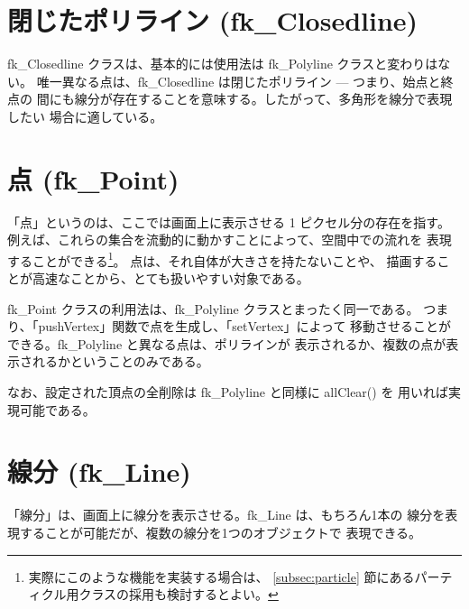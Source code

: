 \section{閉じたポリライン (fk\_Closedline)}
fk\_Closedline クラスは、基本的には使用法は fk\_Polyline クラスと変わりはない。
唯一異なる点は、fk\_Closedline は閉じたポリライン --- つまり、始点と終点の
間にも線分が存在することを意味する。したがって、多角形を線分で表現したい
場合に適している。
\section{点 (fk\_Point)}
「点」というのは、ここでは画面上に表示させる 1 ピクセル分の存在を指す。
例えば、これらの集合を流動的に動かすことによって、空間中での流れを
表現することができる\footnote{実際にこのような機能を実装する場合は、
\ref{subsec:particle} 節にあるパーティクル用クラスの採用も検討するとよい。}。
点は、それ自体が大きさを持たないことや、
描画することが高速なことから、とても扱いやすい対象である。

fk\_Point クラスの利用法は、fk\_Polyline クラスとまったく同一である。
つまり、「pushVertex」関数で点を生成し、「setVertex」によって
移動させることができる。fk\_Polyline と異なる点は、ポリラインが
表示されるか、複数の点が表示されるかということのみである。

なお、設定された頂点の全削除は fk\_Polyline と同様に allClear() を
用いれば実現可能である。
\section{線分 (fk\_Line)}
「線分」は、画面上に線分を表示させる。fk\_Line は、もちろん1本の
線分を表現することが可能だが、複数の線分を1つのオブジェクトで
表現できる。

